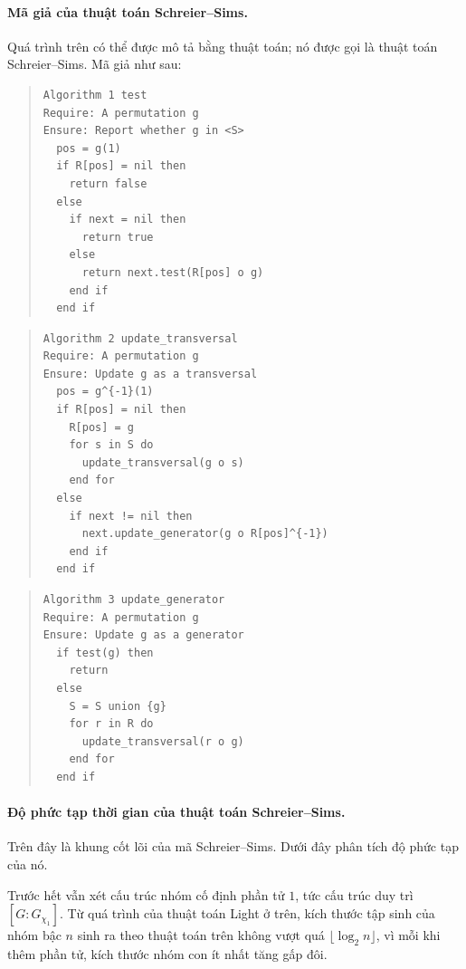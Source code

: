 \documentclass[11pt]{article}
\begin{document}
\paragraph{Mã giả của thuật toán Schreier--Sims.}
Quá trình trên có thể được mô tả bằng thuật toán; nó được gọi là thuật toán
Schreier--Sims. Mã giả như sau:

\begin{quote}
\begin{verbatim}
Algorithm 1 test
Require: A permutation g
Ensure: Report whether g in <S>
  pos = g(1)
  if R[pos] = nil then
    return false
  else
    if next = nil then
      return true
    else
      return next.test(R[pos] o g)
    end if
  end if
\end{verbatim}
\end{quote}

\begin{quote}
\begin{verbatim}
Algorithm 2 update_transversal
Require: A permutation g
Ensure: Update g as a transversal
  pos = g^{-1}(1)
  if R[pos] = nil then
    R[pos] = g
    for s in S do
      update_transversal(g o s)
    end for
  else
    if next != nil then
      next.update_generator(g o R[pos]^{-1})
    end if
  end if
\end{verbatim}
\end{quote}

\begin{quote}
\begin{verbatim}
Algorithm 3 update_generator
Require: A permutation g
Ensure: Update g as a generator
  if test(g) then
    return
  else
    S = S union {g}
    for r in R do
      update_transversal(r o g)
    end for
  end if
\end{verbatim}
\end{quote}

\paragraph{Độ phức tạp thời gian của thuật toán Schreier--Sims.}
Trên đây là khung cốt lõi của mã Schreier--Sims. Dưới đây phân tích độ phức tạp
của nó.

Trước hết vẫn xét cấu trúc nhóm cố định phần tử \(1\), tức cấu trúc duy trì
\([G:G_{\chi_1}]\). Từ quá trình của thuật toán Light ở trên, kích thước tập
sinh của nhóm bậc \(n\) sinh ra theo thuật toán trên không vượt quá
\(\lfloor\log_2 n\rfloor\), vì mỗi khi thêm phần tử, kích thước nhóm con ít
nhất tăng gấp đôi.
\end{document}
